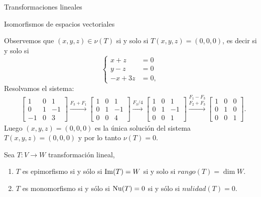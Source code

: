 \begin{chapter}{Transformaciones lineales}
\begin{section}{Isomorfismos de espacios vectoriales}
\begin{ejemplo*}
           Observemos que  $(x,y,z) \in \nu(T)$ si y solo si $ T(x,y,z) = (0,0,0)$,  es decir si y solo si 
           \begin{equation*}
               \begin{cases}
                   x + z &= 0 \\
                   y - z &= 0 \\
                   -x + 3z &=0,
               \end{cases}
           \end{equation*}
           Resolvamos el sistema:
           \begin{align*}
               &\begin{bmatrix}
                1&0&1\\
                0&1&-1\\
                -1&0&3
               \end{bmatrix}
               \stackrel{F_3+F_1}{\longrightarrow}
               \begin{bmatrix}
                1&0&1 \\
                0&1&-1 \\
                0&0&4
               \end{bmatrix}
                \stackrel{F_3/4}{\longrightarrow}
                \begin{bmatrix}
                    1&0&1\\
                    0&1&-1 \\
                    0&0&1 
                \end{bmatrix}
                \stackrel{F_1-F_3}{\stackrel{F_2 +F_3}{\longrightarrow}}
                \begin{bmatrix}
                    1&0&0 \\
                    0&1&0\\
                    0&0&1
                \end{bmatrix}.
           \end{align*}
          Luego $(x,y,z) = (0,0,0)$ es la única solución del sistema $ T(x,y,z) = (0,0,0)$ y por lo tanto  $\nu(T)=0$.
        \end{ejemplo*}

        \begin{observacion*} Sea $T: V \to W$ transformación lineal, 
            \begin{enumerate}
                \item $T$  es {epimorfismo} si y sólo  si $\operatorname{Im}(T) = W$ si  y solo si $rango(T) = \dim W$.
                \item $T$ es {monomorfismo} si y sólo  si $\operatorname{Nu}(T) = 0$ si y sólo si $nulidad(T) =0$.
            \end{enumerate}  
        \end{observacion*}		
        

\end{section}
\end{chapter}
